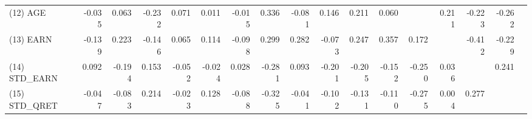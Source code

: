 \begin{table}[H]
\begin{tabular}{lrrrrrrrrrrrrrrrr}
    (12) AGE & -0.035 & 0.063 & -0.232 & 0.071 & 0.011 & -0.015 & 0.336 & -0.081 & 0.146 & 0.211 & 0.060 &  & 0.211 & -0.223 & -0.262 \\
    (13) EARN & -0.139 & 0.223 & -0.146 & 0.065 & 0.114 & -0.098 & 0.299 & 0.282 & -0.073 & 0.247 & 0.357 & 0.172 &  & -0.412 & -0.229 \\
    (14) STD\_EARN & 0.092 & -0.194 & 0.153 & -0.052 & -0.024 & 0.028 & -0.281 & 0.093 & -0.201 & -0.205 & -0.152 & -0.250 & 0.036 &  & 0.241 \\
    (15) STD\_QRET & -0.047 & -0.083 & 0.214 & -0.023 & 0.128 & -0.088 & -0.325 & -0.041 & -0.102 & -0.131 & -0.110 & -0.275 & 0.004 & 0.277 & \\
    \bottomrule
    \bottomrule
    \end{tabular}%
\end{table}%